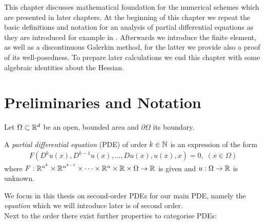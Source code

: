 This chapter discusses mathematical foundation for the numerical schemes which are presented in later chapters.
At the beginning of this chapter we repeat the basic definitions and notation for an analysis of partial differential equations as they are introduced for example in \cite[Introduction]{Evans1998}. Afterwards we introduce the finite element, as well as a discontinuous Galerkin method, for the latter we provide also a proof of its well-posedness. To prepare later calculations we end this chapter with some algebraic identities about the Hessian.

\section{ Preliminaries and Notation}
Let $\Omega \subset \mathbb{R}^d $ be an open, bounded area and $\partial \Omega$ its boundary.
\begin{definition}
 A \emph{partial differential equation} (PDE) of order $k\in \mathbb{N}$ is an expression of the form
\begin{align}
	F(D^k u(x), D^{k-1}u(x), \dots, Du(x), u(x), x) = 0, \; (x \in \Omega)\label{eq:general PDE}
\end{align}
where $F:\mathbb{R}^{n^k} \times \mathbb{R}^{n^{k-1}} \times \dots \times \mathbb{R}^n \times \mathbb{R} \times \Omega \rightarrow \mathbb{R} $ is given and $u:\Omega \rightarrow \mathbb{R}$ is unknown.
\end{definition}
We focus in this thesis on second-order PDEs for our main PDE, namely the \emph{\MA equation} which we will introduce later is of second order. 
\\Next to the order there exist further properties to categorise PDEs:
